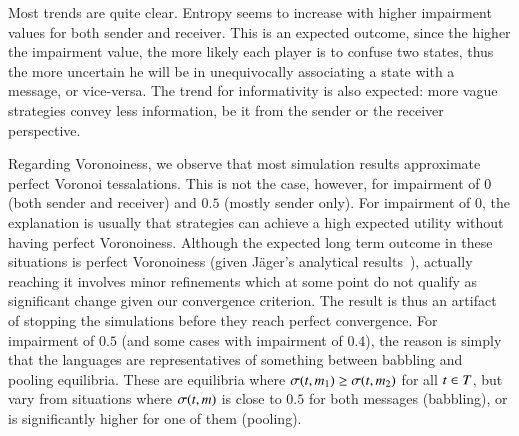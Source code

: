 %
Most trends are quite clear.
Entropy seems to increase with higher impairment values for both sender and receiver.
This is an expected outcome, since the higher the impairment value, the more likely each player is to confuse two states, thus the more uncertain he will be in unequivocally associating a state with a message, or vice-versa.
The trend for informativity is also expected: more vague strategies convey less information, be it from the sender or the receiver perspective.

Regarding Voronoiness, we observe that most simulation results approximate perfect Voronoi tessalations.
This is not the case, however, for impairment of $0$ (both sender and receiver) and $0.5$ (mostly sender only).
For impairment of $0$,  the explanation is usually that strategies can achieve a high expected utility without having perfect Voronoiness.
Although the expected long term outcome in these situations is perfect Voronoiness (given J\"ager's analytical results~\cite{Jager2007}), actually reaching it involves minor refinements which at some point do not qualify as significant change given our convergence criterion.
The result is thus an artifact of stopping the simulations before they reach perfect convergence.
For impairment of $0.5$ (and some cases with impairment of $0.4$), the reason is simply that the languages are representatives of something between babbling and pooling equilibria.
These are equilibria where $\sigma(t,m_1) \geq \sigma(t,m_2)$ for all $t \in T$, but vary from situations where $\sigma(t,m)$ is close to $0.5$ for both messages (babbling), or is significantly higher for one of them (pooling).

